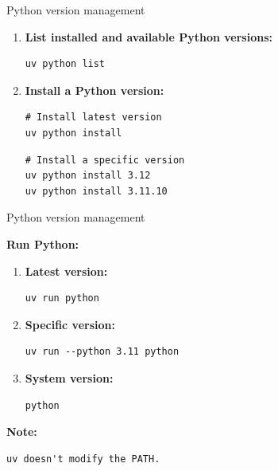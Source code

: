 \documentclass[aspectratio=169,xcolor=dvipsnames,svgnames,x11names,fleqn]{beamer}
\begin{document}
\begin{frame}[containsverbatim]{Python version management}

    \begin{enumerate}
        \item \textbf{List installed and available Python versions:}
        \begin{verbatim}
uv python list
        \end{verbatim}
        \item \textbf{Install a Python version:}
        \begin{verbatim}
# Install latest version
uv python install
        \end{verbatim}
        \begin{verbatim}
# Install a specific version
uv python install 3.12
uv python install 3.11.10
        \end{verbatim}
    \end{enumerate}

\end{frame}

\begin{frame}[containsverbatim]{Python version management}

\textbf{Run Python:}
\begin{enumerate}
    \item \textbf{Latest version:}
    \begin{verbatim}
uv run python
\end{verbatim}
\item \textbf{Specific version:}
\begin{verbatim}
uv run --python 3.11 python
\end{verbatim}
\item \textbf{System version:}
\begin{verbatim}
python
\end{verbatim}
\end{enumerate}

\bigskip
\textbf{Note:}
\begin{verbatim}
uv doesn't modify the PATH.
\end{verbatim}

\end{frame}
\end{document}
